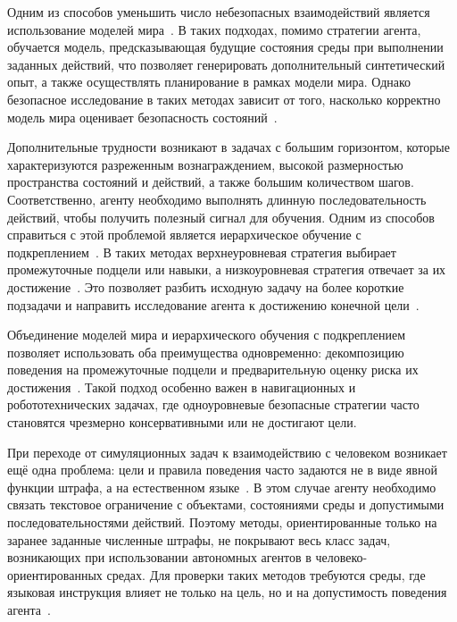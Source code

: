 Одним из способов уменьшить число небезопасных взаимодействий является использование моделей мира~. В таких подходах, помимо стратегии агента, обучается модель, предсказывающая будущие состояния среды при выполнении заданных действий, что позволяет генерировать дополнительный синтетический опыт, а также осуществлять планирование в рамках модели мира. Однако безопасное исследование в таких методах зависит от того, насколько корректно модель мира оценивает безопасность состояний~.

Дополнительные трудности возникают в задачах с большим горизонтом, которые характеризуются разреженным вознаграждением, высокой размерностью пространства состояний и действий, а также большим количеством шагов. Соответственно, агенту необходимо выполнять длинную последовательность действий, чтобы получить полезный сигнал для обучения. Одним из способов справиться с этой проблемой является иерархическое обучение с подкреплением~. В таких методах верхнеуровневая стратегия выбирает промежуточные подцели или навыки, а низкоуровневая стратегия отвечает за их достижение~. Это позволяет разбить исходную задачу на более короткие подзадачи и направить исследование агента к достижению конечной цели~.

Объединение моделей мира и иерархического обучения с подкреплением позволяет использовать оба преимущества одновременно: декомпозицию поведения на промежуточные подцели и предварительную оценку риска их достижения~. Такой подход особенно важен в навигационных и робототехнических задачах, где одноуровневые безопасные стратегии часто становятся чрезмерно консервативными или не достигают цели.

При переходе от симуляционных задач к взаимодействию с человеком возникает ещё одна проблема: цели и правила поведения часто задаются не в виде явной функции штрафа, а на естественном языке~. В этом случае агенту необходимо связать текстовое ограничение с объектами, состояниями среды и допустимыми последовательностями действий. Поэтому методы, ориентированные только на заранее заданные численные штрафы, не покрывают весь класс задач, возникающих при использовании автономных агентов в человеко-ориентированных средах. Для проверки таких методов требуются среды, где языковая инструкция влияет не только на цель, но и на допустимость поведения агента~.

